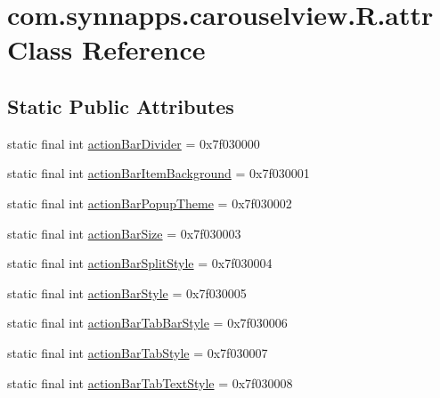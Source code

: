 \hypertarget{classcom_1_1synnapps_1_1carouselview_1_1_r_1_1attr}{}\section{com.\+synnapps.\+carouselview.\+R.\+attr Class Reference}
\label{classcom_1_1synnapps_1_1carouselview_1_1_r_1_1attr}
\subsection*{Static Public Attributes}
\begin{DoxyCompactItemize}
\item 
static final int \mbox{\hyperlink{classcom_1_1synnapps_1_1carouselview_1_1_r_1_1attr_ad8da8ed1442111f714b06ad70d66a808}{action\+Bar\+Divider}} = 0x7f030000
\item 
static final int \mbox{\hyperlink{classcom_1_1synnapps_1_1carouselview_1_1_r_1_1attr_aecff2669f28de4d9a411c2fc4eb17c9e}{action\+Bar\+Item\+Background}} = 0x7f030001
\item 
static final int \mbox{\hyperlink{classcom_1_1synnapps_1_1carouselview_1_1_r_1_1attr_afac663b0cfca84374b4014598826fb61}{action\+Bar\+Popup\+Theme}} = 0x7f030002
\item 
static final int \mbox{\hyperlink{classcom_1_1synnapps_1_1carouselview_1_1_r_1_1attr_a567d52a4b158460e49ce31e964f2f0fb}{action\+Bar\+Size}} = 0x7f030003
\item 
static final int \mbox{\hyperlink{classcom_1_1synnapps_1_1carouselview_1_1_r_1_1attr_a431769fdfd087da1afee37ba2d8fe95b}{action\+Bar\+Split\+Style}} = 0x7f030004
\item 
static final int \mbox{\hyperlink{classcom_1_1synnapps_1_1carouselview_1_1_r_1_1attr_a69c7ac40301f91360d3ddd4861c8c823}{action\+Bar\+Style}} = 0x7f030005
\item 
static final int \mbox{\hyperlink{classcom_1_1synnapps_1_1carouselview_1_1_r_1_1attr_a0daf01d18ceb9b44821691035b920c47}{action\+Bar\+Tab\+Bar\+Style}} = 0x7f030006
\item 
static final int \mbox{\hyperlink{classcom_1_1synnapps_1_1carouselview_1_1_r_1_1attr_a5dd177cddb7a73e24dc14bb520662366}{action\+Bar\+Tab\+Style}} = 0x7f030007
\item 
static final int \mbox{\hyperlink{classcom_1_1synnapps_1_1carouselview_1_1_r_1_1attr_a578edfdb692aaa9f5cad3a2014faa03f}{action\+Bar\+Tab\+Text\+Style}} = 0x7f030008
\item 

\end{DoxyCompactItemize}

